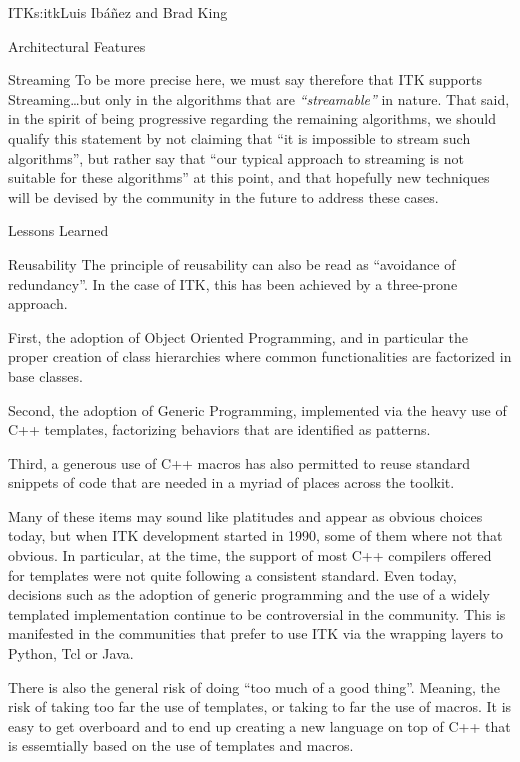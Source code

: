 \begin{aosachapter}{ITK}{s:itk}{Luis Ib\'{a}\~{n}ez and Brad King}
\begin{aosasect1}{Architectural Features}
\begin{aosasect2}{Streaming}
To be more precise here, we must say therefore that ITK supports
Streaming\ldots but only in the algorithms that are \emph{``streamable''} in
nature. That said, in the spirit of being progressive regarding the remaining
algorithms, we should qualify this statement by not claiming that ``it is
impossible to stream such algorithms'', but rather say that ``our typical
approach to streaming is not suitable for these algorithms'' at this point, and
that hopefully new techniques will be devised by the community in the future to
address these cases.
\end{aosasect2}

\end{aosasect1}

\begin{aosasect1}{Lessons Learned}

\begin{aosasect2}{Reusability}
The principle of reusability can also be read as ``avoidance of redundancy''.
In the case of ITK, this has been achieved by a three-prone approach.

\begin{aosaitemize}
\item First, the adoption of Object Oriented Programming, and in particular the
proper creation of class hierarchies where common functionalities are
factorized in base classes.
\item Second, the adoption of Generic Programming, implemented via the heavy
use of C++ templates, factorizing behaviors that are identified as patterns.
\item Third, a generous use of C++ macros has also permitted to reuse standard
snippets of code that are needed in a myriad of places across the toolkit.
\end{aosaitemize}

Many of these items may sound like platitudes and appear as obvious
choices today, but when ITK development started in 1990, some of them
where not that obvious. In particular, at the time, the support of
most C++ compilers offered for templates were not quite following a
consistent standard. Even today, decisions such as the adoption of
generic programming and the use of a widely templated implementation
continue to be controversial in the community. This is manifested in
the communities that prefer to use ITK via the wrapping layers to
Python, Tcl or Java.

There is also the general risk of doing ``too much of a good thing''.
Meaning, the risk of taking too far the use of templates, or taking to
far the use of macros. It is easy to get overboard and to end up
creating a new language on top of C++ that is essemtially based on the
use of templates and macros.


\end{aosasect2}
\end{aosasect1}
\end{aosachapter}
